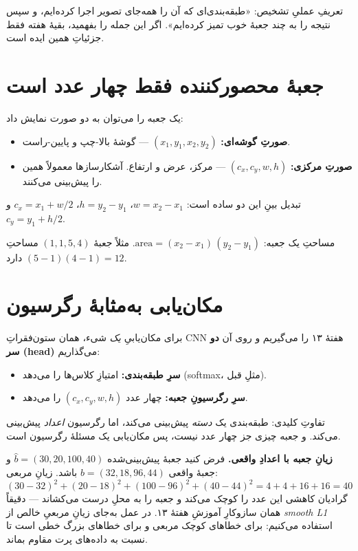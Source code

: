 \documentclass[12pt,a4paper]{article}
\begin{document}
\begin{nokte}
تعریفِ عملیِ تشخیص: «طبقه‌بندی‌ای که آن را همه‌جای تصویر اجرا کرده‌ایم، و سپس نتیجه را به چند جعبهٔ خوب تمیز کرده‌ایم». اگر این جمله را بفهمید، بقیهٔ هفته فقط جزئیاتِ همین ایده است.
\end{nokte}

\section{جعبهٔ محصورکننده فقط چهار عدد است}

یک جعبه را می‌توان به دو صورت نمایش داد:

\begin{itemize}
  \item \textbf{صورتِ گوشه‌ای:} $(x_1,y_1,x_2,y_2)$ — گوشهٔ بالا-چپ و پایین-راست.
  \item \textbf{صورتِ مرکزی:} $(c_x,c_y,w,h)$ — مرکز، عرض و ارتفاع. آشکارسازها معمولاً همین را پیش‌بینی می‌کنند.
\end{itemize}

تبدیل بینِ این دو ساده است: $w=x_2-x_1$، $h=y_2-y_1$، $c_x=x_1+w/2$ و $c_y=y_1+h/2$.

\begin{riyazi}
مساحتِ یک جعبه: $\text{area}=(x_2-x_1)\,(y_2-y_1)$. مثلاً جعبهٔ $(1,1,5,4)$ مساحتِ $(5-1)(4-1)=12$ دارد.
\end{riyazi}

\section{مکان‌یابی به‌مثابهٔ رگرسیون}

برای مکان‌یابیِ \emph{یک} شیء، همان ستون‌فقراتِ CNNِ هفتهٔ ۱۳ را می‌گیریم و روی آن \textbf{دو سر (head)} می‌گذاریم:

\begin{itemize}
  \item \textbf{سرِ طبقه‌بندی:} امتیازِ کلاس‌ها را می‌دهد (softmax، مثلِ قبل).
  \item \textbf{سرِ رگرسیونِ جعبه:} چهار عدد $(c_x,c_y,w,h)$ را می‌دهد.
\end{itemize}

تفاوتِ کلیدی: طبقه‌بندی یک \emph{دسته} پیش‌بینی می‌کند، اما رگرسیون \emph{اعداد} پیش‌بینی می‌کند. و جعبه چیزی جز چهار عدد نیست، پس مکان‌یابی یک مسئلهٔ رگرسیون است.

\begin{riyazi}
\textbf{زیانِ جعبه با اعدادِ واقعی.} فرض کنید جعبهٔ پیش‌بینی‌شده $\hat{b}=(30,20,100,40)$ و جعبهٔ واقعی $b=(32,18,96,44)$ باشد. زیانِ مربعی:
\[
(30{-}32)^2+(20{-}18)^2+(100{-}96)^2+(40{-}44)^2 = 4+4+16+16 = 40
\]
گرادیان کاهشی این عدد را کوچک می‌کند و جعبه را به محلِ درست می‌کشاند — دقیقاً همان سازوکارِ آموزشِ هفتهٔ ۱۳. در عمل به‌جای زیانِ مربعیِ خالص از \emph{smooth L1} استفاده می‌کنیم: برای خطاهای کوچک مربعی و برای خطاهای بزرگ خطی است تا نسبت به داده‌های پرت مقاوم بماند.
\end{riyazi}
\end{document}
